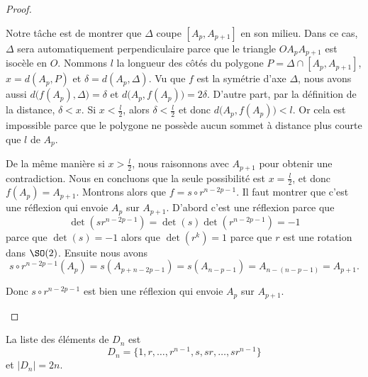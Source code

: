 \begin{proof}
\begin{enumerate}
		      Notre tâche est de montrer que \( \Delta\) coupe \( [A_p,A_{p+1}]\) en son milieu. Dans ce cas, \( \Delta\) sera automatiquement perpendiculaire parce que le triangle \( OA_pA_{p+1}\) est isocèle en \( O\). Nommons \( l\) la longueur des côtés du polygone \( P=\Delta\cap[A_p,A_{p+1}]\), \( x=d(A_p,P)\) et \( \delta=d(A_p,\Delta)\). Vu que \( f\) est la symétrie d'axe \( \Delta\), nous avons aussi \( d\big( f(A_p),\Delta \big)=\delta\) et \( d\big( A_p,f(A_p) \big)=2\delta\). D'autre part, par la définition de la distance, \( \delta<x\). Si \( x<\frac{ l }{2}\), alors \( \delta<\frac{l}{2}\) et donc \( d\big( A_p,f(A_p) \big)<l\). Or cela est impossible parce que le polygone ne possède aucun sommet à distance plus courte que \( l\) de \( A_p\).

		      De la même manière si \( x>\frac{ l }{2}\), nous raisonnons avec \( A_{p+1}\) pour obtenir une contradiction. Nous en concluons que la seule possibilité est \( x=\frac{ l }{2}\), et donc \( f(A_p)=A_{p+1}\). Montrons alors que \( f=s\circ r^{n-2p-1}\). Il faut montrer que c'est une réflexion qui envoie \( A_p\) sur \( A_{p+1}\). D'abord c'est une réflexion parce que
		      \begin{equation}
			      \det(sr^{n-2p-1})=\det(s)\det(r^{n-2p-1})=-1
		      \end{equation}
		      parce que \( \det(s)=-1\) alors que \( \det(r^k)=1\) parce que \( r\) est une rotation dans \( \SO(2)\). Ensuite nous avons
		      \begin{equation}
			      s\circ r^{n-2p-1}(A_p)=s(A_{p+n-2p-1})=s(A_{n-p-1})=A_{n-(n-p-1)}=A_{p+1}.
		      \end{equation}

		      Donc \( s\circ r^{n-2p-1}\) est bien une réflexion qui envoie \( A_p\) sur \( A_{p+1}\).

	\end{enumerate}
\end{proof}

\begin{corollary}   \label{CorWYITsWW}
	La liste des éléments de \( D_n\) est
	\begin{equation}
		D_n=\{ 1,r,\ldots, r^{n-1},s,sr,\ldots, sr^{n-1} \}
	\end{equation}
	et \( | D_n |=2n\).
\end{corollary}

